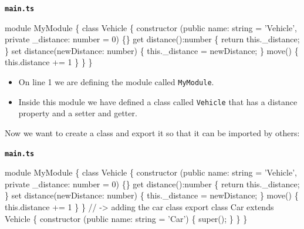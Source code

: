\documentclass[12pt,]{article}
\newenvironment{Shaded}{}{}
\newcommand{\KeywordTok}[1]{\textcolor[rgb]{0.00,0.00,1.00}{{#1}}}
\newcommand{\DecValTok}[1]{{#1}}
\newcommand{\CommentTok}[1]{\textcolor[rgb]{0.00,0.50,0.00}{{#1}}}
\newcommand{\FunctionTok}[1]{{#1}}
\newcommand{\NormalTok}[1]{{#1}}
\providecommand{\tightlist}{%
  \setlength{\itemsep}{0pt}\setlength{\parskip}{0pt}}
\begin{document}
\textbf{\texttt{main.ts}}

\begin{Shaded}
\begin{Highlighting}[numbers=left,,]
\NormalTok{module MyModule \{}
  \KeywordTok{class} \NormalTok{Vehicle \{}
    \FunctionTok{constructor} \NormalTok{(}\KeywordTok{public} \NormalTok{name: string = 'Vehicle', }\KeywordTok{private} \NormalTok{_distance: number = }\DecValTok{0}\NormalTok{) \{\}}
    \NormalTok{get }\FunctionTok{distance}\NormalTok{():number \{ }\KeywordTok{return} \KeywordTok{this}\NormalTok{.}\FunctionTok{_distance}\NormalTok{; \}}
    \NormalTok{set }\FunctionTok{distance}\NormalTok{(newDistance: number) \{ }\KeywordTok{this}\NormalTok{.}\FunctionTok{_distance} \NormalTok{= newDistance; \}}
    \FunctionTok{move}\NormalTok{() \{ }\KeywordTok{this}\NormalTok{.}\FunctionTok{distance} \NormalTok{+= }\DecValTok{1} \NormalTok{\}}
  \NormalTok{\}}
\NormalTok{\}}
\end{Highlighting}
\end{Shaded}

\begin{itemize}
\tightlist
\item
  On line 1 we are defining the module called \texttt{MyModule}.
\item
  Inside this module we have defined a class called \texttt{Vehicle}
  that has a distance property and a setter and getter.
\end{itemize}

Now we want to create a class and export it so that it can be imported
by others:

\textbf{\texttt{main.ts}}

\begin{Shaded}
\begin{Highlighting}[numbers=left,,]
\NormalTok{module MyModule \{}
  \KeywordTok{class} \NormalTok{Vehicle \{}
    \FunctionTok{constructor} \NormalTok{(}\KeywordTok{public} \NormalTok{name: string = 'Vehicle', }\KeywordTok{private} \NormalTok{_distance: number = }\DecValTok{0}\NormalTok{) \{\}}
    \NormalTok{get }\FunctionTok{distance}\NormalTok{():number \{ }\KeywordTok{return} \KeywordTok{this}\NormalTok{.}\FunctionTok{_distance}\NormalTok{; \}}
    \NormalTok{set }\FunctionTok{distance}\NormalTok{(newDistance: number) \{ }\KeywordTok{this}\NormalTok{.}\FunctionTok{_distance} \NormalTok{= newDistance; \}}
    \FunctionTok{move}\NormalTok{() \{ }\KeywordTok{this}\NormalTok{.}\FunctionTok{distance} \NormalTok{+= }\DecValTok{1} \NormalTok{\}}
  \NormalTok{\}}
  \CommentTok{// -> adding the car class}
  \NormalTok{export }\KeywordTok{class} \NormalTok{Car }\KeywordTok{extends} \NormalTok{Vehicle \{}
    \FunctionTok{constructor} \NormalTok{(}\KeywordTok{public} \NormalTok{name: string = 'Car') \{}
      \KeywordTok{super}\NormalTok{();}
    \NormalTok{\}}
  \NormalTok{\}}
\NormalTok{\}}
\end{Highlighting}
\end{Shaded}
\end{document}
